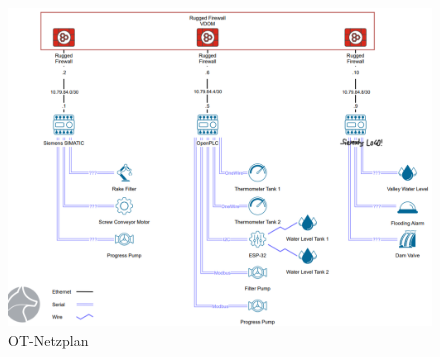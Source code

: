 \documentclass[
	headings=optiontotocandhead,%
	oneside,
	numbers=noenddot,%
	toc=flat, %
	10pt, %
	parskip=full, %
	listof=totoc, %
	listof=flat, %
	numbers=noenddot, %
	bibliography=totoc, %
	a4paper,DIV=14,
]{scrartcl}
\begin{document}
\begin{figure}[h]
	\centering
	\includegraphics[width=0.9\linewidth]{20241008_3}
	\caption[]{OT-Netzplan}
\end{figure}
\FloatBarrier 
\end{document}
